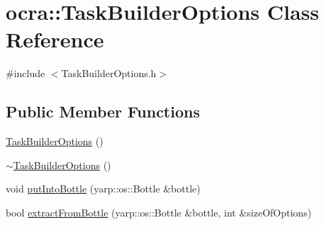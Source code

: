 \hypertarget{classocra_1_1TaskBuilderOptions}{}\section{ocra\+:\+:Task\+Builder\+Options Class Reference}
\label{classocra_1_1TaskBuilderOptions}


{\ttfamily \#include $<$Task\+Builder\+Options.\+h$>$}

\subsection*{Public Member Functions}
\begin{DoxyCompactItemize}
\item 
\hyperlink{classocra_1_1TaskBuilderOptions_a99045de3fc12a569cb9a2bf6b60bbc34}{Task\+Builder\+Options} ()
\item 
\hyperlink{classocra_1_1TaskBuilderOptions_a25342a6bc49b3d63c9e512e73ff1721c}{$\sim$\+Task\+Builder\+Options} ()
\item 
void \hyperlink{classocra_1_1TaskBuilderOptions_abc99093a68bc991fa711aa6a7e55506a}{put\+Into\+Bottle} (yarp\+::os\+::\+Bottle \&bottle)
\item 
bool \hyperlink{classocra_1_1TaskBuilderOptions_a60271152310747f327d76d1f6557df4c}{extract\+From\+Bottle} (yarp\+::os\+::\+Bottle \&bottle, int \&size\+Of\+Options)
\end{DoxyCompactItemize}
